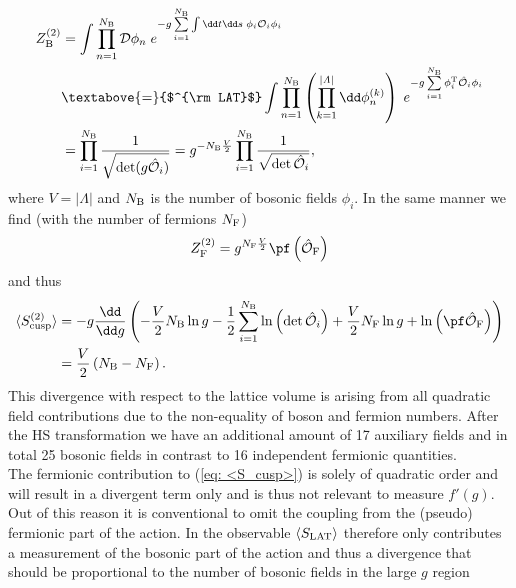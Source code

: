 \begin{equation}
\begin{alignedat}{2}
Z_{\rm B}^{(2)} &= \int \prod\limits_{n=1}^{N_{\rm B}} \mathcal{D}\phi_{n} \; e^{-g \sum\limits_{i=1}^{N_{\rm B}} \int \dd t \dd s\; \phi_{i} \mathcal{O}_{i} \phi_{i}} \\
%
%
&\textabove{=}{$^{\rm LAT}$} \int \prod\limits_{n=1}^{N_{\rm B}} \left( \prod\limits_{k=1}^{\vert \mathit{\Lambda}\vert} \dd \phi_{n}^{(k)} \right) \; e^{-g \sum\limits_{i=1}^{N_{\rm B}} \phi_{i}^{\rm T}\hat{\mathcal{O}}_{i}\phi_{i}} \\
%
%
&= \prod\limits_{i=1}^{N_{\rm B}} \frac{1}{\sqrt{\det (g \hat{\mathcal{O}}_{i})}}   =    g^{-N_{\rm B}\frac{V}{2}} \prod\limits_{i=1}^{N_{\rm B}} \frac{1}{\sqrt{\det \hat{\mathcal{O}}_{i}}}  ,
\end{alignedat}
\end{equation}
%
%
where $V=\vert \mathit{\Lambda}\vert$ and $N_{\rm B}$ is the number of bosonic fields $\phi_{i}$. In the same manner we find (with the number of fermions $N_{\rm F}$)
%
%
\begin{equation}
Z_{\rm F}^{(2)}= g^{N_{\rm F}\frac{V}{2}} \pf \left(\hat{\mathcal{O}}_{\rm F} \right)
\end{equation}
%
%
and thus
%
%
\begin{equation}
\begin{alignedat}{2}
\langle S_{\rm cusp}^{(2)} \rangle &= -g \frac{\dd }{\dd g} \left( -\frac{V}{2}N_{\rm B} \ln g -\frac{1}{2} \sum\limits_{i=1}^{N_{\rm B}} \ln \left(\det \hat{\mathcal{O}}_{i}\right) + \frac{V}{2} N_{\rm F} \ln g + \ln \left( \pf \hat{\mathcal{O}}_{\rm F} \right) \right) \\
%
%
&= \frac{V}{2} \left(N_{\rm B} - N_{\rm F}\right).
\end{alignedat}
\end{equation}
%
%
This divergence with respect to the lattice volume is arising from all quadratic field contributions due to the non-equality of boson and fermion numbers. After the HS transformation we have an additional amount of 17 auxiliary fields and in total 25 bosonic fields in contrast to 16 independent fermionic quantities. \\
The fermionic contribution to (\ref{eq: <S_cusp>}) is solely of quadratic order and will result in a divergent term only and is thus not relevant to measure $f'(g)$. Out of this reason it is conventional  to omit the coupling from the (pseudo) fermionic part of the action. In the observable $\langle S_{\rm LAT} \rangle$ therefore only contributes a measurement of the bosonic part of the action and thus a divergence that should be proportional to the number of bosonic fields in the large $g$ region
